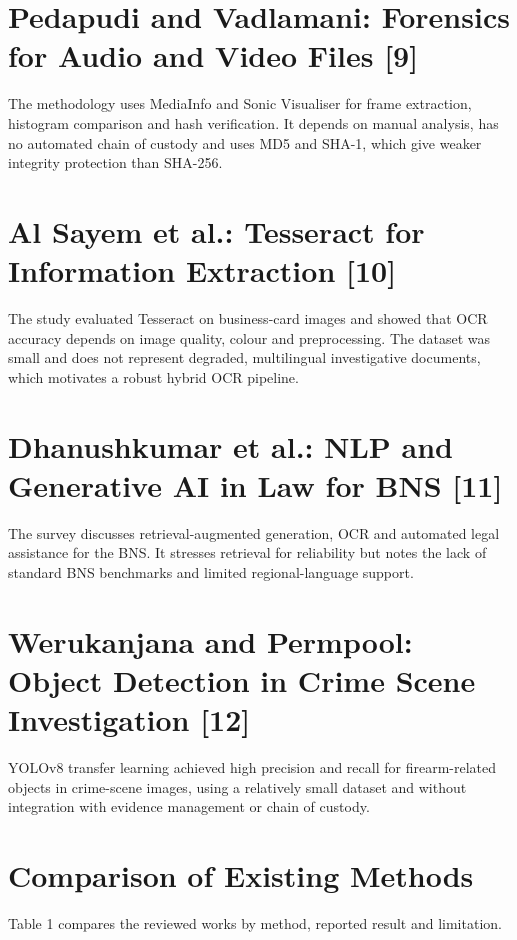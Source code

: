 \documentclass[12pt,a4paper,oneside]{report}
\begin{document}
\section{Pedapudi and Vadlamani: Forensics for Audio and Video Files [9]}
The methodology uses MediaInfo and Sonic Visualiser for frame extraction, histogram comparison and hash verification. It depends on manual analysis, has no automated chain of custody and uses MD5 and SHA-1, which give weaker integrity protection than SHA-256.

\section{Al Sayem et al.: Tesseract for Information Extraction [10]}
The study evaluated Tesseract on business-card images and showed that OCR accuracy depends on image quality, colour and preprocessing. The dataset was small and does not represent degraded, multilingual investigative documents, which motivates a robust hybrid OCR pipeline.

\section{Dhanushkumar et al.: NLP and Generative AI in Law for BNS [11]}
The survey discusses retrieval-augmented generation, OCR and automated legal assistance for the BNS. It stresses retrieval for reliability but notes the lack of standard BNS benchmarks and limited regional-language support.

\section{Werukanjana and Permpool: Object Detection in Crime Scene Investigation [12]}
YOLOv8 transfer learning achieved high precision and recall for firearm-related objects in crime-scene images, using a relatively small dataset and without integration with evidence management or chain of custody.

\section{Comparison of Existing Methods}
Table 1 compares the reviewed works by method, reported result and limitation.
\end{document}

